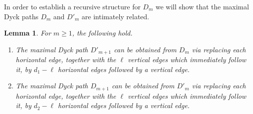 \documentclass[10pt]{amsart}
\newtheorem{lemma}[theorem]{Lemma}
\theoremstyle{definition}
\begin{document}
In order to establish a recursive structure for $D_m$ we will show that the maximal Dyck paths $D_m$ and $D'_m$ are intimately related.
\begin{lemma}
 \label{le:Dyck path recursion}
 For $m\ge1$, the following hold.
 \begin{enumerate}[label=(\alph*)]
 \item\label{lemma2.3_1} The maximal Dyck path $D'_{m+1}$ can be obtained from $D_m$ via replacing each horizontal edge, together with the $\ell$ vertical edges which immediately follow it, by $d_1-\ell$ horizontal edges followed by a vertical edge.
 \item\label{lemma2.3_2} The maximal Dyck path $D_{m+1}$ can be obtained from $D'_m$ via replacing each horizontal edge, together with the $\ell$ vertical edges which immediately follow it, by $d_2-\ell$ horizontal edges followed by a vertical edge.
 \end{enumerate}
\end{lemma}
\end{document}
